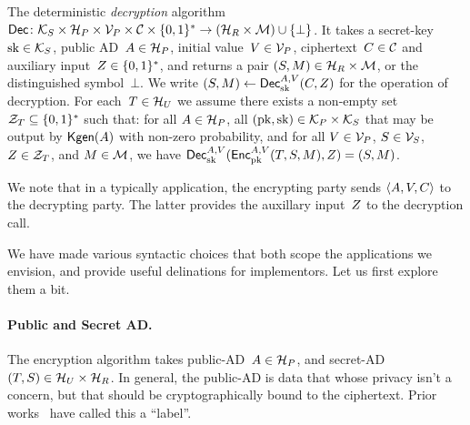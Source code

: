 The deterministic \emph{decryption} algorithm ${\mathsf{Dec}} \colon \mathcal{K}_S \times \mathcal{H}_P \times \mathcal{V}_P \times \mathcal{C} \times \{0,1\}^* \to \left(\mathcal{H}_R \times \mathcal{M}\right) \cup \{\bot\}$.  It takes a secret-key~$\mathrm{sk}\in\mathcal{K}_S$, public AD~$A \in \mathcal{H}_P$, initial value~$V \in \mathcal{V}_P$, ciphertext~$C \in \mathcal{C}$ and auxiliary input~$Z\in\{0,1\}^*$, and returns a pair $(S,M) \in \mathcal{H}_R\times\mathcal{M}$, or the distinguished symbol~$\bot$.  We write $(S,M) \gets {\mathsf{Dec}}_{\mathrm{sk}}^{A,V}(C,Z)$ for the operation of decryption.   For each~$T\in\mathcal{H}_U$ we assume there exists a non-empty set $\mathcal{Z}_T \subseteq \{0,1\}^*$ such that:  for all $A\in\mathcal{H}_P$, all $(\mathrm{pk},\mathrm{sk})\in\mathcal{K}_P\times\mathcal{K}_S$ that may be output by $\mathsf{Kgen}(A)$ with non-zero probability, and for all $V\in\mathcal{V}_P$, $S\in\mathcal{V}_S$, $Z\in\mathcal{Z}_T$,  and $M\in\mathcal{M}$, we have ${\mathsf{Dec}}_{\mathrm{sk}}^{A,V}({\mathsf{Enc}}_{\mathrm{pk}}^{A,V}(T,S,M),Z)=(S,M)$. 

We note that in a typically application, the encrypting party sends $\langle A,V,C \rangle$ to the decrypting party. The latter provides the auxillary input~$Z$ to the decryption call.

We have made various syntactic choices that both scope the applications we envision, and provide useful delinations for implementors.  Let us first explore them a bit.  

\paragraph{Public and Secret AD. }  
The encryption algorithm takes public-AD~$A \in \mathcal{H}_P$, and secret-AD~$(T,S)\in\mathcal{H}_U\times\mathcal{H}_R$.  In general, the public-AD is data that whose privacy isn't a concern, but that should be cryptographically bound to the ciphertext.  Prior works~\cite{XXX} have called this a ``label''.  

